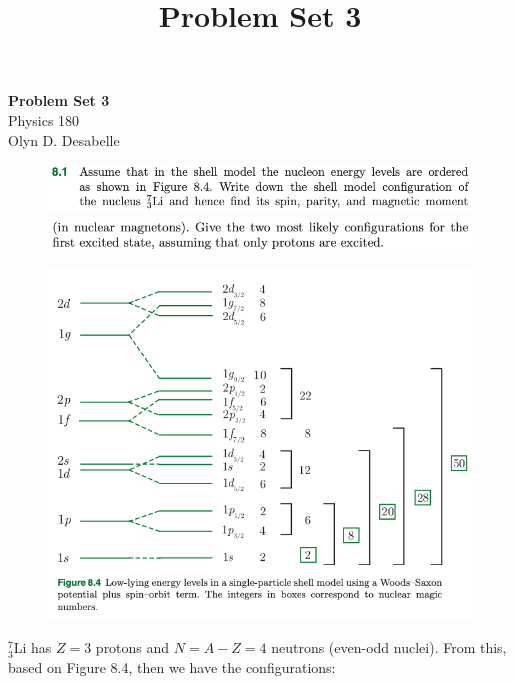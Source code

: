 \documentclass[11pt]{article}
\theoremstyle{definition}
\begin{document}
\setcounter{section}{2}
\title{Problem Set 3}

\section*{}
\begin{center}
{\LARGE \bf Problem Set 3}\\
{\large Physics 180}\\
Olyn D. Desabelle
\end{center}

\begin{figure}[h!]
    \centering
    \includegraphics[scale = 0.5]{8.1a.png}
    \includegraphics[scale = 0.5]{8.1b.png}
\end{figure}

\begin{figure}[h!]
    \centering
    \includegraphics[scale = 0.5]{fig8.4.png}
\end{figure}

$_3^7$Li has $Z=3$ protons and $N = A-Z = 4$ neutrons (even-odd nuclei). From this, based on Figure 8.4, then we have the configurations:
\end{document}
